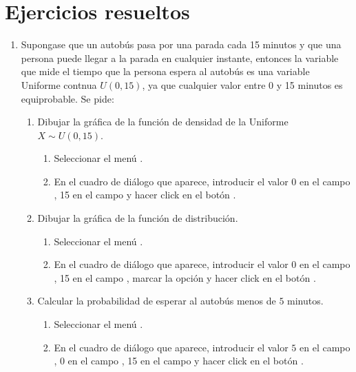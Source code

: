 \section{Ejercicios resueltos}
\begin{enumerate}[leftmargin=*]
\item Supongase que un autobús pasa por una parada cada 15 minutos y que una persona puede llegar a la parada en
cualquier instante, entonces la variable que mide el tiempo que la persona espera al autobús es una variable Uniforme
contnua $U(0,15)$, ya que cualquier valor entre 0 y 15 minutos es equiprobable.
Se pide:
\begin{enumerate}
\item Dibujar la gráfica de la función de densidad de la Uniforme $X\sim U(0,15)$. 
\begin{indicacion}{
\begin{enumerate}
\item Seleccionar el menú .
\item En el cuadro de diálogo que aparece, introducir el valor 0 en el campo , 15 en el campo
 y hacer click en el botón .
\end{enumerate}}
\end{indicacion}

\item Dibujar la gráfica de la función de distribución. 
\begin{indicacion}{
\begin{enumerate}
\item Seleccionar el menú .
\item En el cuadro de diálogo que aparece, introducir el valor 0 en el campo , 15 en el campo
, marcar la opción  y hacer click en el botón .
\end{enumerate}}\end{indicacion}

\item Calcular la probabilidad de esperar al autobús menos de $5$ minutos.
\begin{indicacion}{
\begin{enumerate}
\item Seleccionar el menú .
\item En el cuadro de diálogo que aparece, introducir el valor $5$ en el campo , 0 en
el campo , 15 en el campo  y hacer click en el botón .
\end{enumerate}}
\end{indicacion}


\end{enumerate}
\end{enumerate}
